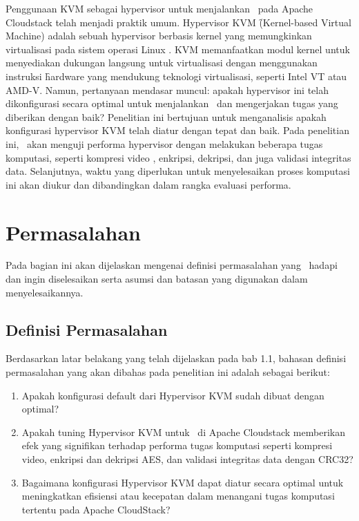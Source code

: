 Penggunaan KVM sebagai hypervisor untuk menjalankan \vm\ pada Apache Cloudstack telah menjadi praktik umum. Hypervisor KVM \f{(Kernel-based Virtual Machine)} adalah sebuah hypervisor berbasis kernel yang memungkinkan virtualisasi pada sistem operasi Linux \cite{whatiskvm}. KVM memanfaatkan modul kernel untuk menyediakan dukungan langsung untuk virtualisasi dengan menggunakan instruksi \f{hardware} yang mendukung teknologi virtualisasi, seperti Intel VT atau AMD-V. Namun, pertanyaan mendasar muncul: apakah hypervisor ini telah dikonfigurasi secara optimal untuk menjalankan \vm\ dan mengerjakan tugas yang diberikan dengan baik? Penelitian ini bertujuan untuk menganalisis apakah konfigurasi hypervisor KVM telah diatur dengan tepat dan baik. Pada penelitian ini, \saya\ akan menguji performa hypervisor dengan melakukan beberapa tugas komputasi, seperti kompresi video \cite{Folgar2014eg}, enkripsi, dekripsi, dan juga validasi integritas data. Selanjutnya, waktu yang diperlukan untuk menyelesaikan proses komputasi ini akan diukur dan dibandingkan dalam rangka evaluasi performa.


\section{Permasalahan}
Pada bagian ini akan dijelaskan mengenai definisi permasalahan yang \saya\ hadapi dan ingin diselesaikan serta asumsi dan batasan yang digunakan dalam menyelesaikannya.

\subsection{Definisi Permasalahan}
Berdasarkan latar belakang yang telah dijelaskan pada bab 1.1, bahasan definisi permasalahan yang akan dibahas pada penelitian ini adalah sebagai berikut:
\begin{enumerate}
      \item Apakah konfigurasi default dari Hypervisor KVM sudah dibuat dengan optimal?
      \item Apakah tuning Hypervisor KVM untuk \vm\ di Apache Cloudstack memberikan efek yang signifikan terhadap performa tugas komputasi seperti kompresi video, enkripsi dan dekripsi AES, dan validasi integritas data dengan CRC32?
      \item Bagaimana konfigurasi Hypervisor KVM dapat diatur secara optimal untuk meningkatkan efisiensi atau kecepatan dalam menangani tugas komputasi tertentu pada Apache CloudStack?
\end{enumerate}

